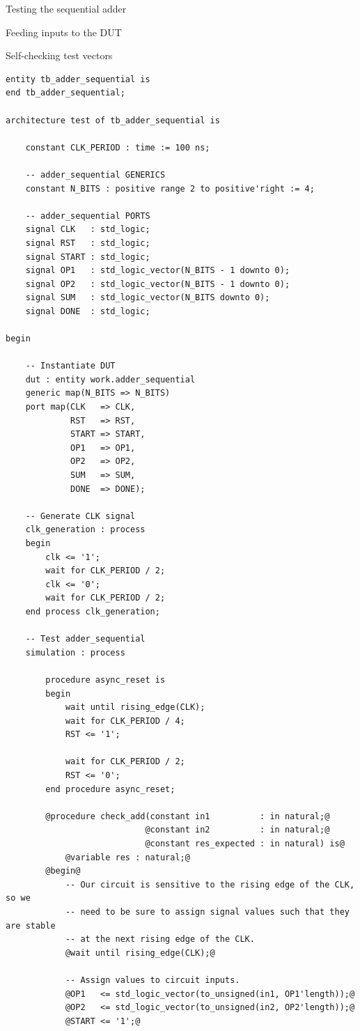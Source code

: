 \documentclass[lab]{course}
\begin{document}
\begin{section}{Testing the sequential adder}
\begin{subsection}{Feeding inputs to the DUT}
\begin{subsubsection}{Self-checking test vectors}
\begin{lstlisting}[caption={Add test vectors}, label={lst:sequential_process_simulation_test_vectors}]
entity tb_adder_sequential is
end tb_adder_sequential;

architecture test of tb_adder_sequential is

    constant CLK_PERIOD : time := 100 ns;

    -- adder_sequential GENERICS
    constant N_BITS : positive range 2 to positive'right := 4;

    -- adder_sequential PORTS
    signal CLK   : std_logic;
    signal RST   : std_logic;
    signal START : std_logic;
    signal OP1   : std_logic_vector(N_BITS - 1 downto 0);
    signal OP2   : std_logic_vector(N_BITS - 1 downto 0);
    signal SUM   : std_logic_vector(N_BITS downto 0);
    signal DONE  : std_logic;

begin

    -- Instantiate DUT
    dut : entity work.adder_sequential
    generic map(N_BITS => N_BITS)
    port map(CLK   => CLK,
             RST   => RST,
             START => START,
             OP1   => OP1,
             OP2   => OP2,
             SUM   => SUM,
             DONE  => DONE);

    -- Generate CLK signal
    clk_generation : process
    begin
        clk <= '1';
        wait for CLK_PERIOD / 2;
        clk <= '0';
        wait for CLK_PERIOD / 2;
    end process clk_generation;

    -- Test adder_sequential
    simulation : process

        procedure async_reset is
        begin
            wait until rising_edge(CLK);
            wait for CLK_PERIOD / 4;
            RST <= '1';

            wait for CLK_PERIOD / 2;
            RST <= '0';
        end procedure async_reset;

        @procedure check_add(constant in1          : in natural;@
                            @constant in2          : in natural;@
                            @constant res_expected : in natural) is@
            @variable res : natural;@
        @begin@
            -- Our circuit is sensitive to the rising edge of the CLK, so we
            -- need to be sure to assign signal values such that they are stable
            -- at the next rising edge of the CLK.
            @wait until rising_edge(CLK);@

            -- Assign values to circuit inputs.
            @OP1   <= std_logic_vector(to_unsigned(in1, OP1'length));@
            @OP2   <= std_logic_vector(to_unsigned(in2, OP2'length));@
            @START <= '1';@


\end{lstlisting}
\end{subsubsection}
\end{subsection}
\end{section}
\end{document}
